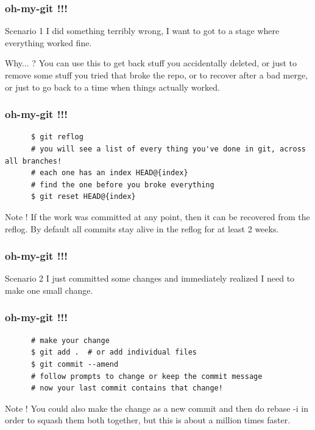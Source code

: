 \documentclass[10pt]{beamer}
\begin{document}
\begin{frame}
  \frametitle{oh-my-git !!!}
  \begin{alertblock}{Scenario 1}
    I did something terribly wrong, I want to got to a stage where everything worked fine.
  \end{alertblock}
  \pause
  \begin{block}{Why... ?}
    You can use this to get back stuff you accidentally deleted, or just to remove some stuff you
    tried that broke the repo, or to recover after a bad merge, or just to go back to a time when things actually worked.
  \end{block}
\end{frame}

\begin{frame}[fragile]
  \frametitle{oh-my-git !!!}
  \begin{example}[Solution]
    \begin{verbatim}
      $ git reflog
      # you will see a list of every thing you've done in git, across all branches!
      # each one has an index HEAD@{index}
      # find the one before you broke everything
      $ git reset HEAD@{index}
    \end{verbatim}
  \end{example}
  \pause
  \begin{block}{Note !}
    If the work was committed at any point, then it can be recovered from the reflog.
    By default all commits stay alive in the reflog for at least 2 weeks.
  \end{block}
\end{frame}

\begin{frame}
  \frametitle{oh-my-git !!!}
  \begin{alertblock}{Scenario 2}
    I just committed some changes and immediately realized I need to make one small change.
  \end{alertblock}
\end{frame}

\begin{frame}[fragile]
  \frametitle{oh-my-git !!!}
  \begin{example}[Solution]
    \begin{verbatim}
      # make your change
      $ git add .  # or add individual files
      $ git commit --amend
      # follow prompts to change or keep the commit message
      # now your last commit contains that change!
    \end{verbatim}
  \end{example}
  \pause
  \begin{block}{Note !}
    You could also make the change as a new commit and then do rebase -i in order to squash them both together,
    but this is about a million times faster.
  \end{block}
\end{frame}
\end{document}

